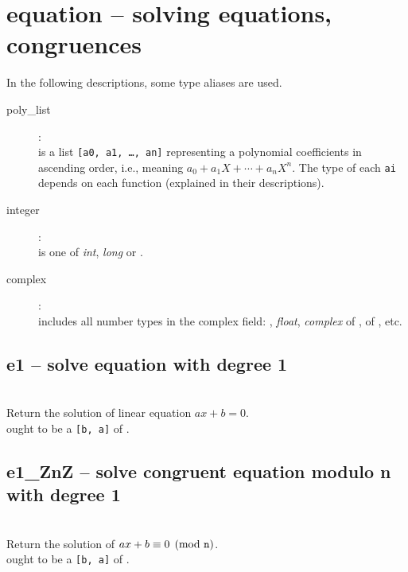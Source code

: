 

 \section{equation -- solving equations, congruences }

 In the following descriptions, some type aliases are used.
 \begin{description}
   \item[poly\_list]:\\
      is a list {\tt [a0, a1, \ldots, an]}
     representing a polynomial coefficients in ascending order, i.e.,
     meaning \(a_0 + a_1 X + \cdots + a_n X^n\).  The type of each
     {\tt ai} depends on each function (explained in their descriptions).

   \item[integer]:\\
      is one of {\it int}, {\it long} or .
   \item[complex]:\\
      includes all number types in the complex field:
     , {\it float}, {\it complex} of \python,
      of \nzmath, etc.\\
 \end{description}
%
  \subsection{e1 -- solve equation with degree 1}
   \\
   \spacing
   \quad Return the solution of linear equation $ax + b = 0$.\\
   \spacing
   \quad {} ought to be a  {\tt [b, a]} of .\\
%
  \subsection{e1\_ZnZ -- solve congruent equation modulo n with degree 1}
   \\
   \spacing
   \quad Return the solution of $ax + b  \equiv 0 \pmod{{\texttt n}}$.\\
   \spacing
   \quad {} ought to be a  {\tt [b, a]} of .\\
%
